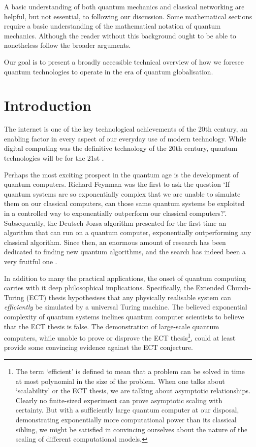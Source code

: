 \documentclass[aps,rmp,twocolumn,amsmath,amssymb,nofootinbib,superscriptaddress,longbibliography,floatfix]{revtex4-1}
\begin{document}
A basic understanding of both quantum mechanics and classical networking are helpful, but not essential, to following our discussion. Some mathematical sections require a basic understanding of the mathematical notation of quantum mechanics. Although the reader without this background ought to be able to nonetheless follow the broader arguments.

Our goal is to present a broadly accessible technical overview of how we foresee quantum technologies to operate in the era of quantum globalisation.

%
%

\section{Introduction}

The internet is one of the key technological achievements of the 20th century, an enabling factor in every aspect of our everyday use of modern technology. While digital computing was the definitive technology of the 20th century, quantum technologies will be for the 21st \cite{bib:NielsenChuang00}. 

Perhaps the most exciting prospect in the quantum age is the development of quantum computers. Richard Feynman \cite{bib:Feynman85} was the first to ask the question `If quantum systems are so exponentially complex that we are unable to simulate them on our classical computers, can those same quantum systems  be exploited in a controlled way to exponentially outperform our classical computers?'. Subsequently, the Deutsch-Jozsa algorithm \cite{DJ} presented for the first time an algorithm that can run on a quantum computer, exponentially outperforming any classical algorithm. Since then, an enormous amount of research has been dedicated to finding new quantum algorithms, and the search has indeed been a very fruitful one \cite{algorithmZoo}.

In addition to many the practical applications, the onset of quantum computing carries with it deep philosophical implications. Specifically, the Extended Church-Turing (ECT) thesis hypothesises that any physically realisable system can \emph{efficiently} be simulated by a universal Turing machine. The believed exponential complexity of quantum systems inclines quantum computer scientists to believe that the ECT thesis is false. The demonstration of large-scale quantum computers, while unable to prove or disprove the ECT thesis\footnote{The term `efficient' is defined to mean that a problem can be solved in time at most polynomial in the size of the problem. When one talks about `scalability' or the ECT thesis, we are talking about asymptotic relationships. Clearly no finite-sized experiment can prove asymptotic scaling with certainty. But with a sufficiently large quantum computer at our disposal, demonstrating exponentially more computational power than its classical sibling, we might be satisfied in convincing ourselves about the nature of the scaling of different computational models.}, could at least provide some convincing evidence against the ECT conjecture.
\end{document}
